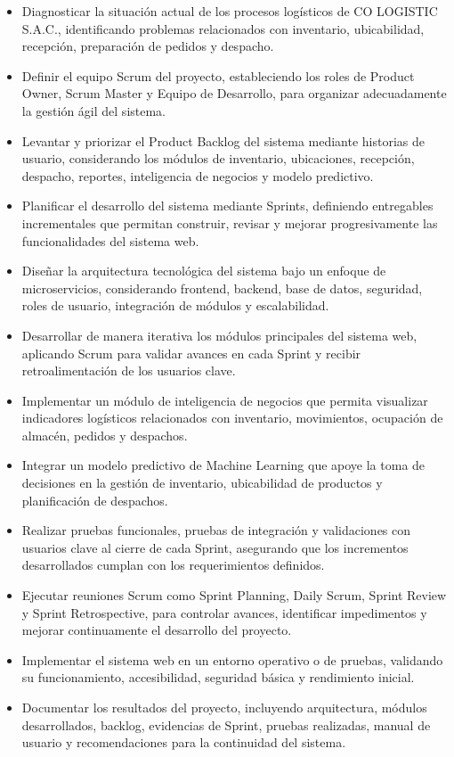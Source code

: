 \documentclass[11pt, a4paper, oneside]{report}
\begin{document}
\begin{itemize}

    \item Diagnosticar la situación actual de los procesos logísticos de CO LOGISTIC S.A.C., identificando problemas relacionados con inventario, ubicabilidad, recepción, preparación de pedidos y despacho.
    \item Definir el equipo Scrum del proyecto, estableciendo los roles de Product Owner, Scrum Master y Equipo de Desarrollo, para organizar adecuadamente la gestión ágil del sistema.
    \item Levantar y priorizar el Product Backlog del sistema mediante historias de usuario, considerando los módulos de inventario, ubicaciones, recepción, despacho, reportes, inteligencia de negocios y modelo predictivo.
    \item Planificar el desarrollo del sistema mediante Sprints, definiendo entregables incrementales que permitan construir, revisar y mejorar progresivamente las funcionalidades del sistema web.
    \item Diseñar la arquitectura tecnológica del sistema bajo un enfoque de microservicios, considerando frontend, backend, base de datos, seguridad, roles de usuario, integración de módulos y escalabilidad.
    \item Desarrollar de manera iterativa los módulos principales del sistema web, aplicando Scrum para validar avances en cada Sprint y recibir retroalimentación de los usuarios clave.
    \item Implementar un módulo de inteligencia de negocios que permita visualizar indicadores logísticos relacionados con inventario, movimientos, ocupación de almacén, pedidos y despachos.
    \item Integrar un modelo predictivo de Machine Learning que apoye la toma de decisiones en la gestión de inventario, ubicabilidad de productos y planificación de despachos.
    \item Realizar pruebas funcionales, pruebas de integración y validaciones con usuarios clave al cierre de cada Sprint, asegurando que los incrementos desarrollados cumplan con los requerimientos definidos.
    \item Ejecutar reuniones Scrum como Sprint Planning, Daily Scrum, Sprint Review y Sprint Retrospective, para controlar avances, identificar impedimentos y mejorar continuamente el desarrollo del proyecto.
    \item Implementar el sistema web en un entorno operativo o de pruebas, validando su funcionamiento, accesibilidad, seguridad básica y rendimiento inicial.
    \item Documentar los resultados del proyecto, incluyendo arquitectura, módulos desarrollados, backlog, evidencias de Sprint, pruebas realizadas, manual de usuario y recomendaciones para la continuidad del sistema.

\end{itemize}
\end{document}
